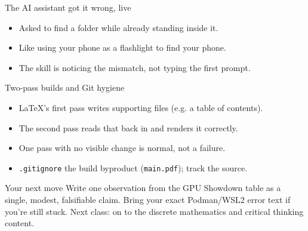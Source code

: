 \documentclass[aspectratio=169,10pt]{beamer}
\begin{document}
\begin{frame}{The AI assistant got it wrong, live}
\begin{itemize}
\item Asked to find a folder while already standing inside it.
\item Like using your phone as a flashlight to find your phone.
\item The skill is noticing the mismatch, not typing the first prompt.
\end{itemize}
\end{frame}
\begin{frame}{Two-pass builds and Git hygiene}
\begin{itemize}
\item LaTeX's first pass writes supporting files (e.g. a table of contents).
\item The second pass reads that back in and renders it correctly.
\item One pass with no visible change is normal, not a failure.
\item \texttt{.gitignore} the build byproduct (\texttt{main.pdf}); track the source.
\end{itemize}
\end{frame}
\begin{frame}{Your next move}
Write one observation from the GPU Showdown table as a single, modest, falsifiable claim. Bring your exact Podman/WSL2 error text if you're still stuck. Next class: on to the discrete mathematics and critical thinking content.
\end{frame}
\end{document}
